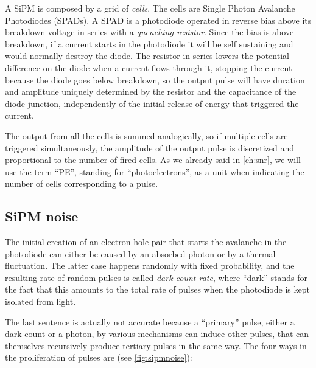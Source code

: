 A SiPM is composed by a grid of \emph{cells}. The cells are Single Photon
Avalanche Photodiodes (SPADs). A SPAD is a photodiode operated in reverse bias
above its breakdown voltage in series with a \emph{quenching resistor}. Since
the bias is above breakdown, if a current starts in the photodiode it will be
self sustaining and would normally destroy the diode. The resistor in series
lowers the potential difference on the diode when a current flows through it,
stopping the current because the diode goes below breakdown, so the output
pulse will have duration and amplitude uniquely determined by the resistor and
the capacitance of the diode junction, independently of the initial release of
energy that triggered the current.

The output from all the cells is summed analogically, so if multiple cells are
triggered simultaneously, the amplitude of the output pulse is discretized and
proportional to the number of fired cells. As we already said in
\autoref{ch:snr}, we will use the term ``PE'', standing for ``photoelectrons'',
as a unit when indicating the number of cells corresponding to a pulse.

\subsection{SiPM noise}

The initial creation of an electron-hole pair that starts the avalanche in the
photodiode can either be caused by an absorbed photon or by a thermal
fluctuation. The latter case happens randomly with fixed probability, and the
resulting rate of random pulses is called \emph{dark count rate}, where
``dark'' stands for the fact that this amounts to the total rate of pulses when
the photodiode is kept isolated from light.

The last sentence is actually not accurate because a ``primary'' pulse, either
a dark count or a photon, by various mechanisms can induce other pulses, that
can themselves recursively produce tertiary pulses in the same way. The four
ways in the proliferation of pulses are (see \autoref{fig:sipmnoise}):

